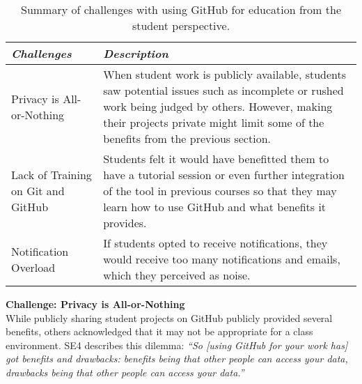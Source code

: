 \begin{table}[h]
    \vspace{1pt}
        \caption{Summary of challenges with using GitHub for education from the student perspective.}\label{table:interviews:students:challenges}
    \vspace{1pt}
    \begin{center}
        \begin{tabular}{ | m{3cm} | m{12cm} | }
            \hline
            \emph{Challenges} & \emph{Description} \\
            \hline
            Privacy is All-or-Nothing & When student work is publicly available, students saw potential issues such as incomplete or rushed work being judged by others. However, making their projects private might limit some of the benefits from the previous section. \\
            \hline
            Lack of Training on Git and GitHub & Students felt it would have benefitted them to have a tutorial session or even further integration of the tool in previous courses so that they may learn how to use GitHub and what benefits it provides. \\
            \hline
            Notification Overload & If students opted to receive notifications, they would receive too many notifications and emails, which they perceived as noise. \\
            \hline
        \end{tabular}
    \end{center}
\end{table}

\textbf{Challenge: Privacy is All-or-Nothing} \\
While publicly sharing student projects on GitHub publicly provided several benefits, others acknowledged that it may not be appropriate for a class environment. SE4 describes this dilemma: \textit{``So [using GitHub for your work has] got benefits and drawbacks: benefits being that other people can access your data, drawbacks being that other people can access your data.''}

